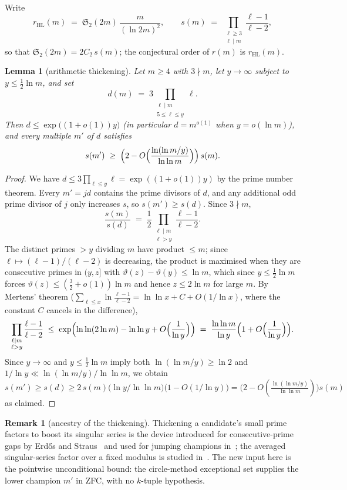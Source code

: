 \documentclass[11pt]{article}
\theoremstyle{plain}
\newtheorem{lemma}[theorem]{Lemma}
\theoremstyle{definition}
\newtheorem{remark}[theorem]{Remark}
\newcommand{\rch}{r}
\begin{document}
Write
\[
r_{\mathrm{HL}}(m) \;=\;
\mathfrak{S}_2(2m)\,\frac{m}{(\ln 2m)^{2}},
\qquad
s(m) \;=\; \prod_{\substack{\ell \ge 3 \\ \ell \mid m}}
\frac{\ell - 1}{\ell - 2},
\]
so that $\mathfrak{S}_2(2m) = 2 C_2\, s(m)$; the conjectural order of
$\rch(m)$ is $r_{\mathrm{HL}}(m)$.

\begin{lemma}[arithmetic thickening]\label{lem:thick}
Let $m \ge 4$ with $3 \nmid m$, let $y \to \infty$ subject to
$y \le \frac{1}{2}\ln m$, and set
\[
d(m) \;=\; 3 \prod_{\substack{\ell \mid m \\ 5 \le \ell \le y}} \ell .
\]
Then $d \le \exp\bigl((1+o(1))y\bigr)$ (in particular $d = m^{o(1)}$
when $y = o(\ln m)$), and every multiple $m'$ of $d$ satisfies
\[
s(m') \;\ge\; \Bigl(2 - O\Bigl(\frac{\ln(\ln m / y)}{\ln\ln m}\Bigr)\Bigr)\, s(m).
\]
\end{lemma}

\begin{proof}
We have $d \le 3\prod_{\ell \le y} \ell
= \exp((1+o(1))y)$ by the prime number theorem. Every
$m' = j d$ contains the prime divisors of $d$, and any additional odd
prime divisor of $j$ only increases $s$, so $s(m') \ge s(d)$. Since
$3 \nmid m$,
\[
\frac{s(m)}{s(d)}
\;=\; \frac{1}{2} \prod_{\substack{\ell \mid m \\ \ell > y}}
\frac{\ell - 1}{\ell - 2}.
\]
The distinct primes $> y$ dividing $m$ have product $\le m$;
since $\ell \mapsto (\ell-1)/(\ell-2)$ is decreasing, the product
is maximised when they are consecutive primes in $(y, z]$ with
$\vartheta(z) - \vartheta(y) \le \ln m$, which since
$y \le \frac{1}{2}\ln m$ forces
$\vartheta(z) \le (\tfrac{3}{2}+o(1))\ln m$ and hence $z \le 2\ln m$
for large $m$. By Mertens' theorem
($\sum_{\ell \le x}\ln\frac{\ell-1}{\ell-2} = \ln\ln x + C + O(1/\ln x)$,
where the constant $C$ cancels in the difference),
\[
\prod_{\substack{\ell \mid m \\ \ell > y}} \frac{\ell-1}{\ell-2}
\;\le\;
\exp\Bigl(\ln\ln(2\ln m) - \ln\ln y + O\Bigl(\frac{1}{\ln y}\Bigr)\Bigr)
\;=\; \frac{\ln\ln m}{\ln y}\Bigl(1 + O\Bigl(\frac{1}{\ln y}\Bigr)\Bigr).
\]
Since $y \to \infty$ and $y \le \frac{1}{2}\ln m$ imply both
$\ln(\ln m/y) \ge \ln 2$ and
$1/\ln y \ll \ln(\ln m/y)/\ln\ln m$, we obtain
$s(m') \ge s(d) \ge 2\,s(m)\bigl(\ln y/\ln\ln m\bigr)\bigl(1 - O(1/\ln y)\bigr)
= \bigl(2 - O(\frac{\ln(\ln m/y)}{\ln\ln m})\bigr)s(m)$
as claimed.
\end{proof}

\begin{remark}[ancestry of the thickening]
\label{rem:thickanc}
Thickening a candidate's small prime factors to boost its
singular series is the device introduced for consecutive-prime
gaps by Erd\H{o}s and Straus~\cite{erdosstraus} and used for
jumping champions in~\cite{goldstonledoan}; the averaged
singular-series factor over a fixed modulus is studied
in~\cite{ikedasuriajaya}. The new input here is the pointwise
unconditional bound: the circle-method exceptional set supplies
the lower champion $m'$ in ZFC, with no $k$-tuple hypothesis.
\end{remark}
\end{document}

